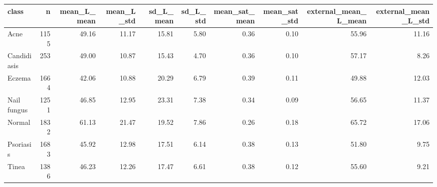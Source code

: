 \begin{tabular}{lrrrrrrrrr}
\toprule
class & n & mean\_L\_mean & mean\_L\_std & sd\_L\_mean & sd\_L\_std & mean\_sat\_mean & mean\_sat\_std & external\_mean\_L\_mean & external\_mean\_L\_std \\
\midrule
Acne & 1155 & 49.16 & 11.17 & 15.81 & 5.80 & 0.36 & 0.10 & 55.96 & 11.16 \\
Candidiasis & 253 & 49.00 & 10.87 & 15.43 & 4.70 & 0.36 & 0.10 & 57.17 & 8.26 \\
Eczema & 1664 & 42.06 & 10.88 & 20.29 & 6.79 & 0.39 & 0.11 & 49.88 & 12.03 \\
Nail fungus & 1251 & 46.85 & 12.95 & 23.31 & 7.38 & 0.34 & 0.09 & 56.65 & 11.37 \\
Normal & 1832 & 61.13 & 21.47 & 19.52 & 7.86 & 0.26 & 0.18 & 65.72 & 17.06 \\
Psoriasis & 1683 & 45.92 & 12.98 & 17.51 & 6.14 & 0.38 & 0.13 & 51.80 & 9.75 \\
Tinea & 1386 & 46.23 & 12.26 & 17.47 & 6.61 & 0.38 & 0.12 & 55.60 & 9.21 \\
\bottomrule
\end{tabular}
